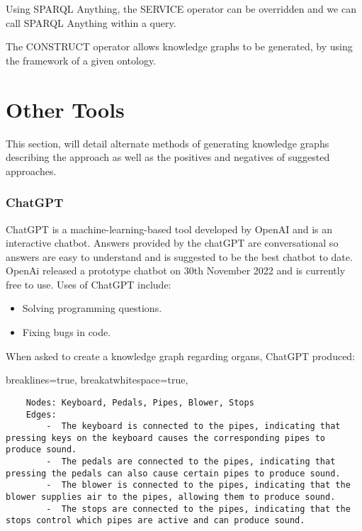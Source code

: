 Using SPARQL Anything, the SERVICE operator can be overridden and we can call SPARQL Anything within a query. \cite{sparqlanything}

The CONSTRUCT operator allows knowledge graphs to be generated, by using the framework of a given ontology. \cite{sparqlanythinggithub}

\section{Other Tools}

\hspace{0.5cm} This section, will detail alternate methods of generating knowledge graphs describing the approach as well as the positives and negatives of suggested approaches.

\subsubsection{ChatGPT}
\hspace{0.5cm}  ChatGPT is a machine-learning-based tool developed by OpenAI and is an interactive chatbot. Answers provided by the chatGPT are conversational so answers are easy to understand and is suggested to be the best chatbot to date. \cite{chatgpt} OpenAi released a prototype chatbot on 30th November 2022 and is currently free to use. Uses of ChatGPT include:

\vspace{-0.15cm}
\begin{itemize}
    \itemsep0em 
\item Solving programming questions.
\vspace{-0.1cm}
\item Fixing bugs in code.
\end{itemize}
\vspace{-0.15cm}

When asked to create a knowledge graph regarding organs, ChatGPT produced:

\lstset
{
    breaklines=true,
    breakatwhitespace=true,
}
\begin{lstlisting}
    Nodes: Keyboard, Pedals, Pipes, Blower, Stops
    Edges:
        -  The keyboard is connected to the pipes, indicating that pressing keys on the keyboard causes the corresponding pipes to produce sound.
        -  The pedals are connected to the pipes, indicating that pressing the pedals can also cause certain pipes to produce sound.
        -  The blower is connected to the pipes, indicating that the blower supplies air to the pipes, allowing them to produce sound.
        -  The stops are connected to the pipes, indicating that the stops control which pipes are active and can produce sound.
\end{lstlisting}

